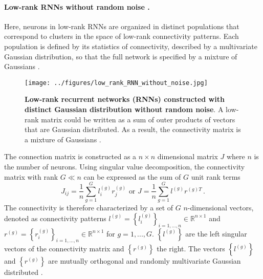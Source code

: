 \documentclass[11pt]{article}
\begin{document}
	\paragraph{Low-rank RNNs without random noise \cite{beiran2021shaping, dubreuil2022role}.}
	Here, neurons in low-rank RNNs are organized in distinct populations that correspond to clusters in the space of low-rank connectivity patterns. Each population is defined by its statistics of connectivity, described by a multivariate Gaussian distribution, so that the full network is specified by a mixture of Gaussians \cite{beiran2021shaping}.
		\vspace{-0.2cm}
		\begin{figure}[H]
			\centering
			\texttt{[image: ../figures/low\_rank\_RNN\_without\_noise.jpg]}
			\caption[Low-rank recurrent networks (RNNs) constructed with distinct Gaussian distribution]{\textbf{Low-rank recurrent networks (RNNs) constructed with distinct Gaussian distribution without random noise}. A low-rank matrix could be written as a sum of outer products of vectors that are Gaussian distributed. As a result, the connectivity matrix is a mixture of Gaussians \cite{beiran2023parametric}. }
			\label{fig:low_rank_RNN_without_noise}
		\end{figure}
	The connection matrix is constructed as a $n \times n$ dimensional matrix $J$ where $n$ is the number of neurons. Using singular value decomposition, the connectivity matrix with rank $G \ll n$ can be expressed as the sum of $G$ unit rank terms
		\begin{equation} \label{eq:low_rank_RNN_without_noise}
			J_{ij} = \frac{1}{n}\sum_{g = 1}^{G} l_i^{(g)}r_j^{(g)} \, \, \text{or} \, \, J = \frac{1}{n} \sum_{g=1}^{G} l^{(g)} r^{(g)T} \, . 
		\end{equation}
	The connectivity is therefore characterized by a set of $G$ $n$-dimensional vectors, denoted as connectivity patterns $l^{(g)} = \left\{l_i^{(g)}\right\}_{i = 1, ..., n } \in \mathbb{R}^{n \times 1}$ and $r^{(g)} = \left\{r_i^{(g)}\right\}_{i = 1, ..., n } \in \mathbb{R}^{n \times 1}$ for $g = 1, ..., G$. $\left\{l^{(g)}\right\}$ are the left singular vectors of the connectivity matrix and $\left\{r^{(g)}\right\}$ the right. The vectors $\left\{l^{(g)}\right\}$ and $\left\{r^{(g)}\right\}$ are mutually orthogonal and randomly multivariate Gaussian distributed \cite{beiran2021shaping}. 
	
\end{document}
